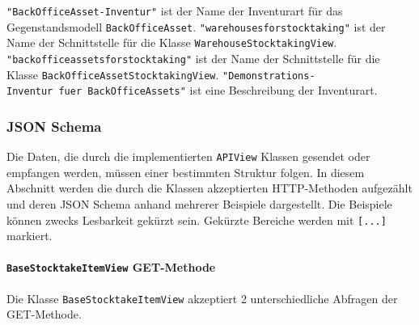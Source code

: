 \begin{Shaded}
\begin{Highlighting}[]
\OperatorTok{=}\NormalTok{ \{}
    \NormalTok{: (}
        \NormalTok{, }
        \NormalTok{, }
\NormalTok{    ),}
    \NormalTok{: (}
        \NormalTok{, }
        \NormalTok{, }
\NormalTok{    )}
\NormalTok{\}}
\end{Highlighting}
\end{Shaded}

\texttt{"BackOfficeAsset-Inventur"} ist der Name der Inventurart für das
Gegenstandsmodell \texttt{BackOfficeAsset}.
\texttt{"warehousesforstocktaking"} ist der Name der Schnittstelle für
die Klasse \texttt{WarehouseStocktakingView}.
\texttt{"backofficeassetsforstocktaking"} ist der Name der Schnittstelle
für die Klasse \texttt{BackOfficeAssetStocktakingView}.
\texttt{"Demonstrations-Inventur\ fuer\ BackOfficeAssets"} ist eine
Beschreibung der Inventurart.

\hypertarget{json-schema}{%
\subsubsection{JSON Schema}\label{json-schema}}

Die Daten, die durch die implementierten \texttt{APIView} Klassen
gesendet oder empfangen werden, müssen einer bestimmten Struktur folgen.
In diesem Abschnitt werden die durch die Klassen akzeptierten
HTTP-Methoden \cite{rest-http-methods} aufgezählt und deren JSON Schema
anhand mehrerer Beispiele dargestellt. Die Beispiele können zwecks
Lesbarkeit gekürzt sein. Gekürzte Bereiche werden mit \texttt{{[}...{]}}
markiert.

\hypertarget{basestocktakeitemview-get-methode}{%
\paragraph{\texorpdfstring{\texttt{BaseStocktakeItemView}
GET-Methode}{BaseStocktakeItemView GET-Methode}}\label{basestocktakeitemview-get-methode}}

Die Klasse \texttt{BaseStocktakeItemView} akzeptiert 2 unterschiedliche
Abfragen der GET-Methode.

